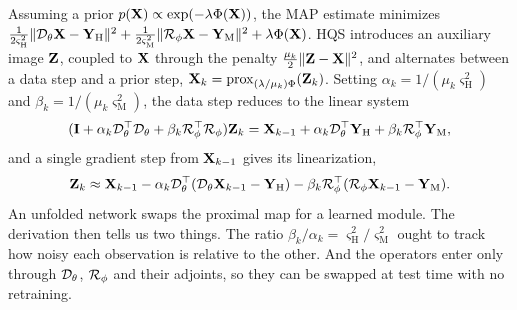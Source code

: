 \documentclass[10pt,twocolumn,letterpaper]{article}
\begin{document}
Assuming a prior $p(\mathbf{X})\propto\exp(-\lambda\Phi(\mathbf{X}))$, the MAP estimate minimizes $\tfrac{1}{2\varsigma_{\mathrm{H}}^2}\|\mathcal{D}_\theta\mathbf{X}-\mathbf{Y}_{\mathrm{H}}\|^2+\tfrac{1}{2\varsigma_{\mathrm{M}}^2}\|\mathcal{R}_\phi\mathbf{X}-\mathbf{Y}_{\mathrm{M}}\|^2+\lambda\Phi(\mathbf{X})$. HQS introduces an auxiliary image $\mathbf{Z}$, coupled to $\mathbf{X}$ through the penalty $\tfrac{\mu_k}{2}\|\mathbf{Z}-\mathbf{X}\|^2$, and alternates between a data step and a prior step, $\mathbf{X}_k=\mathrm{prox}_{(\lambda/\mu_k)\Phi}(\mathbf{Z}_k)$. Setting $\alpha_k=1/(\mu_k\varsigma_{\mathrm{H}}^2)$ and $\beta_k=1/(\mu_k\varsigma_{\mathrm{M}}^2)$, the data step reduces to the linear system
\begin{equation}
(\mathbf{I}+\alpha_k\mathcal{D}_\theta^{\top}\mathcal{D}_\theta+\beta_k\mathcal{R}_\phi^{\top}\mathcal{R}_\phi)\mathbf{Z}_k=\mathbf{X}_{k-1}+\alpha_k\mathcal{D}_\theta^{\top}\mathbf{Y}_{\mathrm{H}}+\beta_k\mathcal{R}_\phi^{\top}\mathbf{Y}_{\mathrm{M}},
\label{eq:normal}
\end{equation}
and a single gradient step from $\mathbf{X}_{k-1}$ gives its linearization,
\begin{equation}
\mathbf{Z}_k\approx\mathbf{X}_{k-1}-\alpha_k\mathcal{D}_\theta^{\top}(\mathcal{D}_\theta\mathbf{X}_{k-1}-\mathbf{Y}_{\mathrm{H}})-\beta_k\mathcal{R}_\phi^{\top}(\mathcal{R}_\phi\mathbf{X}_{k-1}-\mathbf{Y}_{\mathrm{M}}).
\label{eq:linstep}
\end{equation}
An unfolded network swaps the proximal map for a learned module. The derivation then tells us two things. The ratio $\beta_k/\alpha_k=\varsigma_{\mathrm{H}}^2/\varsigma_{\mathrm{M}}^2$ ought to track how noisy each observation is relative to the other. And the operators enter only through $\mathcal{D}_\theta$, $\mathcal{R}_\phi$ and their adjoints, so they can be swapped at test time with no retraining.
\end{document}
